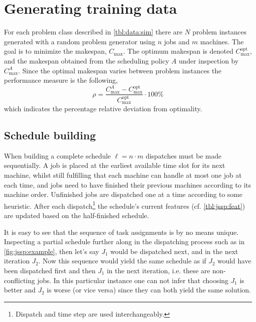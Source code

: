 \documentclass[smallextended]{svjour3}
\begin{document}
\section{Generating training data}\label{sec:gentrainingdata}
For each problem class described in \cref{tbl:data:sim} there are $N$ problem instances generated  with a random problem generator using $n$ jobs and $m$ machines. 
The goal is to minimize the makespan, $C_{\max}$. The optimum makespan is denoted $C_{\max}^{\text{opt}}$, and the makespan obtained from the scheduling policy $A$ under inspection by $C_{\max}^{A}$. Since the optimal makespan varies between problem instances the performance measure is the following, 
\begin{equation}\label{eq:ratio}\rho=\frac{C_{\max}^{A}-C_{\max}^{\text{opt}}}{C_{\max}^{\text{opt}}}\cdot 100\%\end{equation}
which indicates the percentage relative deviation from optimality. %

\subsection{Schedule building}\label{sec:gen:gametree}
When building a complete schedule $\ell=n\cdot m$ dispatches must be made sequentially. 
A job is placed at the earliest available time slot for its next machine, whilst still fulfilling that each machine can handle at most one job at each time, and jobs need to have finished their previous machines according to its machine order. 
Unfinished jobs are dispatched one at a time according to some heuristic. After each dispatch\footnote{Dispatch and time step are used interchangeably.} the schedule's current features (cf. \cref{tbl:jssp:feat}) are updated based on the half-finished schedule. 

It is easy to see that the sequence of task assignments is by no means unique. Inspecting a partial schedule further along in the dispatching process such as in \cref{fig:jssp:example}, then let's say $J_1$ would be dispatched next, and in the next iteration $J_2$. Now this sequence would yield the same schedule as if $J_2$ would have been dispatched first and then $J_1$ in the next iteration, i.e. these are non-conflicting jobs. 
In this particular instance one can not infer that choosing $J_1$ is better and $J_2$ is worse (or vice versa) since they can both yield the same solution.
\end{document}
